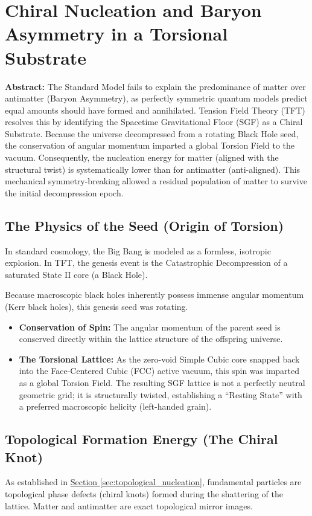 \chapter{Chiral Nucleation and Baryon Asymmetry in a Torsional Substrate}
\label{app:baryon_asymmetry}

\noindent\textbf{Abstract:} The Standard Model fails to explain the predominance of matter over antimatter (Baryon Asymmetry), as perfectly symmetric quantum models predict equal amounts should have formed and annihilated. Tension Field Theory (TFT) resolves this by identifying the Spacetime Gravitational Floor (SGF) as a Chiral Substrate. Because the universe decompressed from a rotating Black Hole seed, the conservation of angular momentum imparted a global Torsion Field to the vacuum. Consequently, the nucleation energy for matter (aligned with the structural twist) is systematically lower than for antimatter (anti-aligned). This mechanical symmetry-breaking allowed a residual population of matter to survive the initial decompression epoch.

\section{The Physics of the Seed (Origin of Torsion)}
In standard cosmology, the Big Bang is modeled as a formless, isotropic explosion. In TFT, the genesis event is the Catastrophic Decompression of a saturated State II core (a Black Hole).

Because macroscopic black holes inherently possess immense angular momentum (Kerr black holes), this genesis seed was rotating.
\begin{itemize}
    \item \textbf{Conservation of Spin:} The angular momentum of the parent seed is conserved directly within the lattice structure of the offspring universe.
    \item \textbf{The Torsional Lattice:} As the zero-void Simple Cubic core snapped back into the Face-Centered Cubic (FCC) active vacuum, this spin was imparted as a global Torsion Field. The resulting SGF lattice is not a perfectly neutral geometric grid; it is structurally twisted, establishing a ``Resting State'' with a preferred macroscopic helicity (left-handed grain).
\end{itemize}

\section{Topological Formation Energy (The Chiral Knot)}
As established in \hyperref[sec:topological_nucleation]{Section \ref*{sec:topological_nucleation}}, fundamental particles are topological phase defects (chiral knots) formed during the shattering of the lattice. Matter and antimatter are exact topological mirror images.

